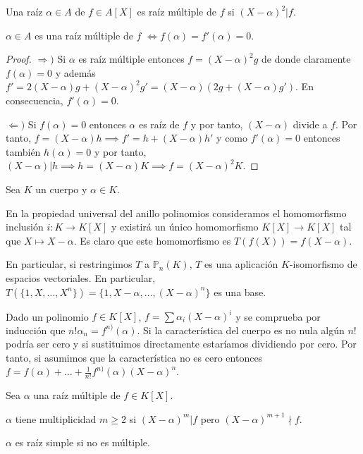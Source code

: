 \begin{definition}
Una raíz $\alpha \in A$ de $f \in A[X]$ es raíz múltiple de $f$ si $(X-\alpha)^2 | f$. 
\end{definition}

\begin{proposition}
$\alpha \in A$ es una raíz múltiple de $f$ $\iff f(\alpha) = f'(\alpha) = 0$.
\end{proposition}
\begin{proof}
$\Rightarrow)$ Si $\alpha$ es raíz múltiple entonces $f = (X-\alpha)^2g$ de donde claramente $f(\alpha) = 0$ y además $f' = 2(X-\alpha)g + (X-\alpha)^2g' = (X-\alpha)(2g + (X-\alpha)g')$. En consecuencia, $f'(\alpha) = 0$. 

$\Leftarrow)$ Si $f(\alpha) = 0$ entonces $\alpha$ es raíz de $f$ y por tanto, $(X-\alpha)$ divide a $f$. Por tanto, $f = (X-\alpha)h \implies f' = h+(X-\alpha)h'$ y como $f'(\alpha) = 0$ entonces también $h(\alpha) = 0$ y por tanto, $(X-\alpha)|h \implies h = (X-\alpha)K \implies f = (X-\alpha)^2K$.
\end{proof}

\begin{definition}
Sea $K$ un cuerpo y $\alpha \in K$. 

En la propiedad universal del anillo polinomios consideramos el homomorfismo inclusión $i:K \to K[X]$ y existirá un único homomorfismo $K[X] \to K[X]$ tal que $X \mapsto X-\alpha$. Es claro que este homomorfismo es $T(f(X)) = f(X-\alpha)$. 

En particular, si restringimos $T$ a $\mathbb{P}_n(K)$, $T$ es una aplicación $K$-isomorfismo de espacios vectoriales. En particular, $T(\{1,X,\ldots,X^n\}) = \{1,X-\alpha,\ldots,(X-\alpha)^n \}$ es una base. 

Dado un polinomio $f \in K[X]$, $f = \sum \alpha_i (X-\alpha)^i$ y se comprueba por inducción que $n!\alpha_n = f^{n)}(\alpha)$. Si la característica del cuerpo es no nula algún $n!$ podría ser cero y si sustituimos directamente estaríamos dividiendo por cero. Por tanto, si asumimos que la característica no es cero entonces $f = f(\alpha) + \ldots + \frac{1}{n!}f^{n)}(\alpha)(X-\alpha)^n$. 
\end{definition}

\begin{definition}
Sea $\alpha$ una raíz múltiple de $f \in K[X]$.

$\alpha$ tiene multiplicidad $m \ge 2$ si $(X-\alpha)^m|f$ pero $(X-\alpha)^{m+1} \nmid f$. 

$\alpha$ es raíz simple si no es múltiple. 
\end{definition}

